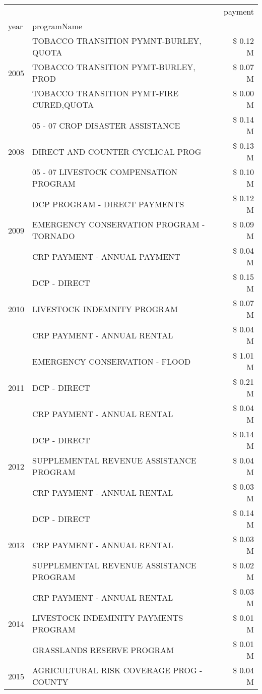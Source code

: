 \begin{tabular}{llr}
\toprule
 &  & payment \\
year & programName &  \\
\midrule
\multirow[t]{3}{*}{2005} & TOBACCO TRANSITION PYMNT-BURLEY, QUOTA & \$ 0.12 M \\
 & TOBACCO TRANSITION PYMT-BURLEY, PROD & \$ 0.07 M \\
 & TOBACCO TRANSITION PYMT-FIRE CURED,QUOTA & \$ 0.00 M \\
\cline{1-3}
\multirow[t]{3}{*}{2008} & 05 - 07 CROP DISASTER ASSISTANCE & \$ 0.14 M \\
 & DIRECT AND COUNTER CYCLICAL PROG & \$ 0.13 M \\
 & 05 - 07 LIVESTOCK COMPENSATION PROGRAM & \$ 0.10 M \\
\cline{1-3}
\multirow[t]{3}{*}{2009} & DCP PROGRAM - DIRECT PAYMENTS & \$ 0.12 M \\
 & EMERGENCY CONSERVATION PROGRAM - TORNADO & \$ 0.09 M \\
 & CRP PAYMENT - ANNUAL PAYMENT & \$ 0.04 M \\
\cline{1-3}
\multirow[t]{3}{*}{2010} & DCP - DIRECT & \$ 0.15 M \\
 & LIVESTOCK INDEMNITY PROGRAM & \$ 0.07 M \\
 & CRP PAYMENT - ANNUAL RENTAL & \$ 0.04 M \\
\cline{1-3}
\multirow[t]{3}{*}{2011} & EMERGENCY CONSERVATION - FLOOD & \$ 1.01 M \\
 & DCP - DIRECT & \$ 0.21 M \\
 & CRP PAYMENT - ANNUAL RENTAL & \$ 0.04 M \\
\cline{1-3}
\multirow[t]{3}{*}{2012} & DCP - DIRECT & \$ 0.14 M \\
 & SUPPLEMENTAL REVENUE ASSISTANCE PROGRAM & \$ 0.04 M \\
 & CRP PAYMENT - ANNUAL RENTAL & \$ 0.03 M \\
\cline{1-3}
\multirow[t]{3}{*}{2013} & DCP - DIRECT & \$ 0.14 M \\
 & CRP PAYMENT - ANNUAL RENTAL & \$ 0.03 M \\
 & SUPPLEMENTAL REVENUE ASSISTANCE PROGRAM & \$ 0.02 M \\
\cline{1-3}
\multirow[t]{3}{*}{2014} & CRP PAYMENT - ANNUAL RENTAL & \$ 0.03 M \\
 & LIVESTOCK INDEMINITY PAYMENTS PROGRAM & \$ 0.01 M \\
 & GRASSLANDS RESERVE PROGRAM & \$ 0.01 M \\
\cline{1-3}
\multirow[t]{3}{*}{2015} & AGRICULTURAL RISK COVERAGE PROG - COUNTY & \$ 0.04 M \\

\end{tabular}
